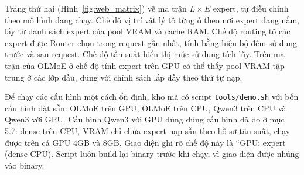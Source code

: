 Trang thứ hai (Hình~\ref{fig:web_matrix}) vẽ ma trận $L\times E$ expert, tự điều chỉnh theo mô hình đang chạy. Chế độ vị trí vật lý tô từng ô theo nơi expert đang nằm, lấy từ danh sách expert của pool VRAM và cache RAM. Chế độ routing tô các expert được Router chọn trong request gần nhất, tính bằng hiệu bộ đếm sử dụng trước và sau request. Chế độ tần suất hiển thị mức sử dụng tích lũy. Trên ma trận của OLMoE ở chế độ tính expert trên GPU có thể thấy pool VRAM tập trung ở các lớp đầu, đúng với chính sách lấp đầy theo thứ tự nạp.

Để chạy các cấu hình một cách ổn định, kho mã có script \texttt{tools/demo.sh} với bốn cấu hình đặt sẵn: OLMoE trên GPU, OLMoE trên CPU, Qwen3 trên CPU và Qwen3 với GPU. Cấu hình Qwen3 với GPU dùng đúng cấu hình đã đo ở mục 5.7: dense trên CPU, VRAM chỉ chứa expert nạp sẵn theo hồ sơ tần suất, chạy được trên cả GPU 4GB và 8GB. Giao diện ghi rõ chế độ này là ``GPU: expert (dense CPU). Script luôn build lại binary trước khi chạy, vì giao diện được nhúng vào binary.
